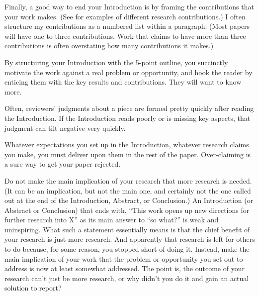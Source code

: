 Finally, a good way to end your Introduction is by framing the contributions that your work makes. (See \cite{wobbrock2012seven} for examples of different research contributions.) 
I often structure my contributions as a numbered list within a paragraph.
(Most papers will have one to three contributions. 
Work that claims to have more than three contributions is often overstating how many contributions it makes.)

By structuring your Introduction with the 5-point outline, you succinctly motivate the work against a real problem or opportunity, and hook the reader by enticing them with the key results and contributions. 
They will want to know more.

Often, reviewers’ judgments about a piece are formed pretty quickly after reading the Introduction. 
If the Introduction reads poorly or is missing key aspects, that judgment can tilt negative very quickly.

Whatever expectations you set up in the Introduction, whatever research claims you make, you must deliver upon them in the rest of the paper. 
Over-claiming is a sure way to
get your paper rejected.

Do not make the main implication of your research that more research is needed. 
(It can be an implication, but not the main one, and certainly not the one called out at the end of the Introduction, Abstract, or Conclusion.) 
An Introduction (or Abstract or Conclusion) that ends with, “This work opens up new directions for further research into X” as its main answer to “so what?” is weak and uninspiring. 
What such a statement essentially means is that the chief benefit of your research is just more research. 
And apparently that research is left for others to do because, for some reason, you stopped short of doing it. 
Instead, make the main implication of your work that the problem or opportunity you set out to address is now at least somewhat addressed. 
The point is, the outcome of your research can’t just be more research, or why didn’t you do it and gain an actual solution to report?

